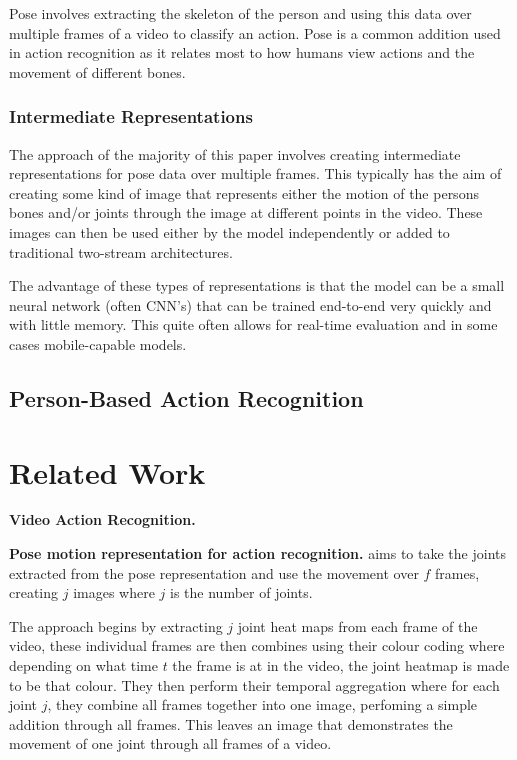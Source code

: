 \documentclass[10pt,twocolumn,letterpaper]{article}
\begin{document}
Pose involves extracting the skeleton of the person and using this data over multiple frames of a video to classify an action. Pose is a common addition used in action recognition as it relates most to how humans view actions and the movement of different bones.

\subsubsection{Intermediate Representations}

The approach of the majority of this paper involves creating intermediate representations for pose data over multiple frames. This typically has the aim of creating some kind of image that represents either the motion of the persons bones and/or joints through the image at different points in the video. These images can then be used either by the model independently or added to traditional two-stream architectures.

The advantage of these types of representations is that the model can be a small neural network (often CNN's) that can be trained end-to-end very quickly and with little memory. This quite often allows for real-time evaluation and in some cases mobile-capable models.

\subsection{Person-Based Action Recognition}

\section{Related Work}
\label{sec:relatedwork}

\textbf{Video Action Recognition.} 

\textbf{Pose motion representation for action recognition.} \cite{potion} aims to take the joints extracted from the pose representation and use the movement over $f$ frames, creating $j$ images where $j$ is the number of joints.

The approach begins by extracting $j$ joint heat maps from each frame of the video, these individual frames are then combines using their colour coding where depending on what time $t$ the frame is at in the video, the joint heatmap is made to be that colour. They then perform their temporal aggregation where for each joint $j$, they combine all frames together into one image, perfoming a simple addition through all frames. This leaves an image that demonstrates the movement of one joint through all frames of a video.
\end{document}

